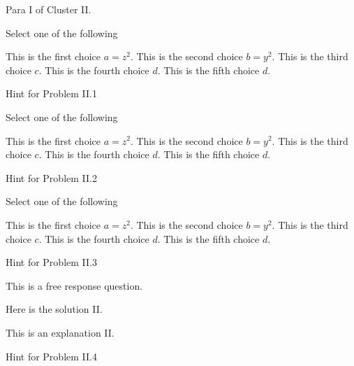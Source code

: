 \begin{cluster}[Cluster II]
\begin{gram}[200]
Para I of Cluster II.
\end{gram}

\begin{flex}
\begin{problem}
Select one of the following
\begin{pickone}
\choice This is the first choice $a = z^2$.
\choice This is the second choice $b = y^2$.
\correctchoice This is the third choice $c$.
\correctchoice This is the fourth choice $d$.
\choice This is the fifth choice $d$.
\end{pickone}

\end{problem}

\begin{hint}[210]
Hint  for Problem II.1
\end{hint}
\end{flex}

\begin{flex}
\begin{problem}
Select one of the following
\begin{pickany}
\choice This is the first choice $a = z^2$.
\choice This is the second choice $b = y^2$.
\correctchoice This is the third choice $c$.
\correctchoice This is the fourth choice $d$.
\choice This is the fifth choice $d$.
\end{pickany}

\end{problem}

\begin{hint}[220]
Hint  for Problem II.2
\end{hint}
\end{flex}
\begin{flex}
\begin{problem}
Select one of the following
\begin{pickone}
\choice This is the first choice $a = z^2$.
\choice This is the second choice $b = y^2$.
\correctchoice This is the third choice $c$.
\correctchoice This is the fourth choice $d$.
\choice This is the fifth choice $d$.
\end{pickone}

\end{problem}

\begin{hint}[230]
Hint  for Problem II.3
\end{hint}
\end{flex}

\begin{flex}
\begin{problem}
This is a free response question.

\solution
Here is the solution II.

\explain
This is an explanation II.

\end{problem}

\begin{hint}[240]
Hint  for Problem II.4
\end{hint}
\end{flex}


\end{cluster}
